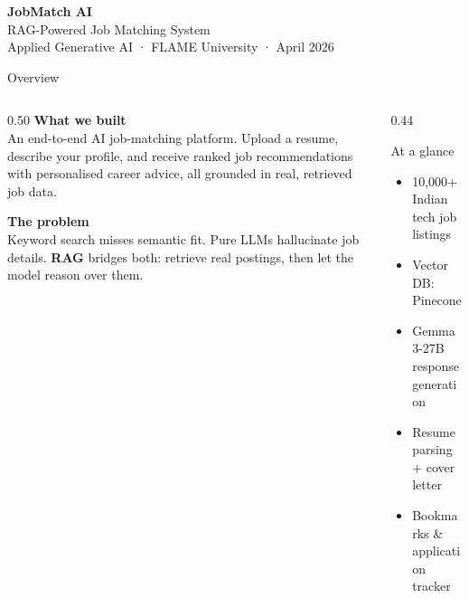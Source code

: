 \documentclass[aspectratio=169]{beamer}
\begin{document}

{
\begin{frame}
  \vfill
  \hskip18pt
  \begin{minipage}{0.85\textwidth}
    \vspace{28pt}
    {\fontsize{34}{38}\selectfont\bfseries\color{ink} JobMatch AI}\\[8pt]
    {\large\color{mid} RAG-Powered Job Matching System}\\[30pt]
    {\small\color{mid} Applied Generative AI · FLAME University · April 2026}
    \vspace{28pt}
  \end{minipage}
  \vfill
\end{frame}
}

\begin{frame}{Overview}
  \begin{columns}[t]
    \begin{column}{0.50\textwidth}
      \textbf{\color{accent}What we built}\\[6pt]
      An end-to-end AI job-matching platform. Upload a resume, describe your
      profile, and receive ranked job recommendations with personalised career
      advice, all grounded in real, retrieved job data.

      \vspace{10pt}
      \textbf{\color{accent}The problem}\\[6pt]
      Keyword search misses semantic fit.
      Pure LLMs hallucinate job details.
      \textbf{RAG} bridges both: retrieve real postings, then let the model
      reason over them.
    \end{column}
    \begin{column}{0.44\textwidth}
      \begin{block}{At a glance}
        \begin{itemize}\small\setlength{\itemsep}{3pt}
          \item 10{,}000+ Indian tech job listings
          \item Vector DB: Pinecone
          \item Gemma 3-27B response generation
          \item Resume parsing + cover letter
          \item Bookmarks \& application tracker
        \end{itemize}
      \end{block}
    \end{column}
  \end{columns}
\end{frame}
\end{document}

